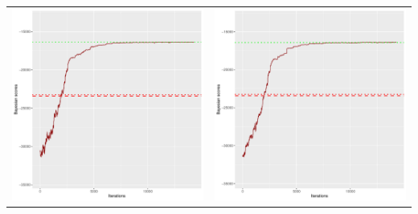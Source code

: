 \documentclass[]{scrartcl}
\begin{document}
\begin{table}[h!]
\begin{tabular}{cc}
\includegraphics[scale = 0.4]{./figs/win95pts/v2/25/bayBoundsEvolution-14252.pdf} & 
\includegraphics[scale = 0.4]{./figs/win95pts/v2/50/bayBoundsEvolution-14252.pdf} \\

\end{tabular}
\end{table}
\end{document}
